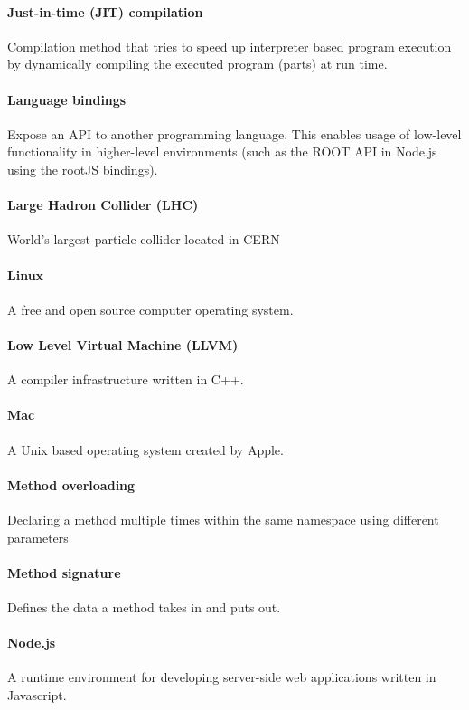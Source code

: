 \paragraph{Just-in-time (JIT) compilation}
Compilation method that tries to speed up interpreter based program execution by dynamically compiling the executed program (parts) at run time.

\paragraph{Language bindings}
Expose an API to another programming language. This enables usage of low-level functionality in higher-level environments (such as the ROOT API in Node.js using the rootJS bindings).

\paragraph{Large Hadron Collider (LHC)}
World's largest particle collider located in CERN

\paragraph{Linux}
A free and open source computer operating system.

\paragraph{Low Level Virtual Machine (LLVM)}
A compiler infrastructure written in C++.

\paragraph{Mac}
A Unix based operating system created by Apple.

\paragraph{Method overloading}
Declaring a method multiple times within the same namespace using different parameters

\paragraph{Method signature}
Defines the data a method takes in and puts out. 

\paragraph{Node.js}
A runtime environment for developing server-side web applications written in Javascript.

